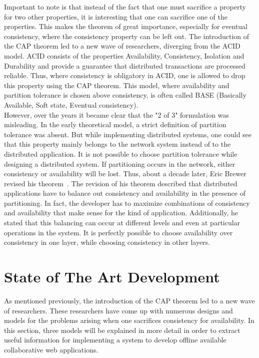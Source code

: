 \documentclass[a4paper,12pt]{report}
\begin{document}
Important to note is that instead of the fact that one must sacrifice a property for two other properties, it is interesting that one can sacrifice one of the properties. This makes the theorem of great importance, especially for eventual consistency, where the consistency property can be left out. The introduction of the CAP theorem led to a new wave of researchers, diverging from the ACID model. ACID consists of the properties Availability, Consistency, Isolation and Durability and provide a guarantee that distributed transactions are processed reliable. Thus, where consistency is obligatory in ACID, one is allowed to drop this property using the CAP theorem. This model, where availability and partition tolerance is chosen above consistency, is often called BASE (Basically Available, Soft state, Eventual consistency). \\
However, over the years it became clear that the "2 of 3" formulation was misleading. In the early theoretical model, a strict definition of partition tolerance was absent. But while implementing distributed systems, one could see that this property mainly belongs to the network system instead of to the distributed application. It is not possible to choose partition tolerance while designing a distributed system. If partitioning occurs in the network, either consistency or availability will be lost. Thus, about a decade later, Eric Brewer revised his theorem~\cite{Brewer2}. The revision of his theorem described that distributed applications have to balance out consistency and availability in the presence of partitioning. In fact, the developer has to maximize combinations of consistency and availability that make sense for the kind of application. Additionally, he stated that this balancing can occur at different levels and even at particular operations in the system. It is perfectly possible to choose availability over consistency in one layer, while choosing consistency in other layers.

\section{State of The Art Development}\label{sec:StateOfTheArt}

As mentioned previously, the introduction of the CAP theorem led to a new wave of researchers. These researchers have come up with numerous designs and models for the problems arising when one sacrifices consistency for availability. In this section, three models will be explained in more detail in order to extract useful information for implementing a system to develop offline available collaborative web applications.
\end{document}
